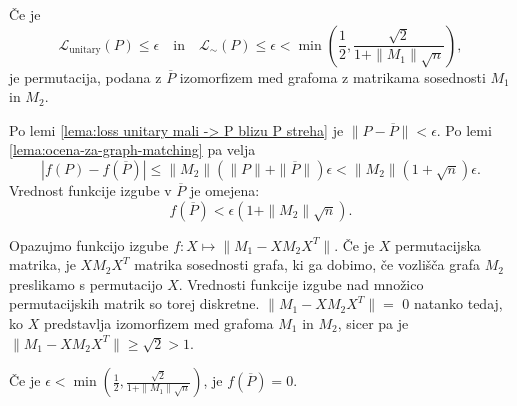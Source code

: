 \documentclass[mat2, tisk]{fmfdelo}
\newcommand{\loss}{\mathcal L}
\newcommand{\Loss}[1]{\mathcal L _\text{#1}}
\begin{document}
\begin{lema}
  Če je
  $$\Loss{unitary}(P) \le \epsilon \quad \text{in} \quad
  \loss_\sim(P) \le \epsilon <
  \min(  \frac{1}{2}
    ,
    \frac{\sqrt{2}}{1 + \|M_1\|\sqrt{n}}
  ),
  $$ je permutacija, podana z $\overline{P}$
  izomorfizem med grafoma z matrikama sosednosti
  $M_1$ in $M_2$.
\end{lema}
\begin{dokaz}
  Po lemi \ref{lema:loss unitary mali -> P blizu P streha}
  je $\|P - \overline{P}\| < \epsilon$.
  Po lemi \ref{lema:ocena-za-graph-matching}
  pa velja
  $$
  |f(P)-f(\overline{P})| \leq  \|M_2\|(\|P\| +
  \|\overline{P}\|)\epsilon
  < \|M_2\|(1 + \sqrt{n})\epsilon.
  $$
  Vrednost funkcije izgube v $\overline{P}$ je omejena:
  $$
  f(\overline{P}) < \epsilon(1 + \|M_2\|\sqrt{n}).
  $$

  Opazujmo funkcijo izgube
  $f \colon X \mapsto \| M_1 - X M_2 X^T \|$.
  Če je $X$ permutacijska matrika, je
  $X M_2 X^T$ matrika sosednosti grafa, ki ga dobimo, če
  vozlišča grafa $M_2$ preslikamo s permutacijo $X$.
  Vrednosti funkcije izgube nad množico permutacijskih matrik so
  torej diskretne.
  $\| M_1 - X M_2 X^T \| = $ $0$ natanko tedaj,
  ko $X$ predstavlja izomorfizem med grafoma $M_1$ in
  $M_2$, sicer pa je
  $\| M_1 - X M_2 X^T \| \geq \sqrt{2} > 1$.

  Če je
  $\epsilon <
  \min(  \frac{1}{2}
    ,
    \frac{\sqrt{2}}{1 + \|M_1\|\sqrt{n}}
  )$, je $f(\overline{P})=0$.
\end{dokaz}
%
%
\end{document}
